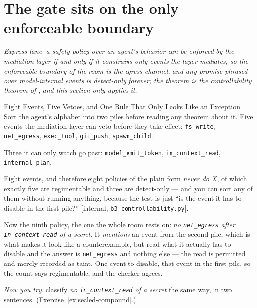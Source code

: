 \documentclass[11pt,a4paper]{article}
\theoremstyle{definition}
\begin{document}


\section{The gate sits on the only enforceable boundary}\label{sec:sealed-enforceability}

\noindent\emph{Express lane: a safety policy over an agent's behavior can be
enforced by the mediation layer if and only if it constrains only events the
layer mediates, so the enforceable boundary of the room is the egress channel,
and any promise phrased over model-internal events is detect-only forever; the
theorem is the controllability theorem of , and this section only applies it.}

\begin{pdexample}{Eight Events, Five Vetoes, and One Rule That Only Looks Like an Exception}
\setlength{\parskip}{4pt plus 1pt}
Sort the agent's alphabet into two piles before reading any theorem about it.
Five events the mediation layer can veto before they take effect:
\texttt{fs\_write}, \texttt{net\_egress}, \texttt{exec\_tool},
\texttt{git\_push}, \texttt{spawn\_child}.

Three it can only watch go past:
\texttt{model\_emit\_token}, \texttt{in\_context\_read},
\texttt{internal\_plan}.

Eight events, and therefore eight policies of the
plain form \emph{never do $X$}, of which exactly five are regimentable and
three are detect-only --- and you can sort any of them without running
anything, because the test is just ``is the event it has to disable in the
first pile?'' [internal, \texttt{b3\_controllability.py}].

Now the ninth
policy, the one the whole room rests on: \emph{no \texttt{net\_egress} after
\texttt{in\_context\_read} of a secret}. It \emph{mentions} an event from the
second pile, which is what makes it look like a counterexample, but read what
it actually has to disable and the answer is \texttt{net\_egress} and nothing
else --- the read is permitted and merely recorded as taint. One event to
disable, that event in the first pile, so the count says regimentable, and the
checker agrees.

\emph{Now you try:} classify \emph{no
\texttt{in\_context\_read} of a secret} the same way, in two sentences.
(Exercise~\ref{ex:sealed-compound}.)
\end{pdexample}
\end{document}
